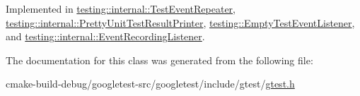 Implemented in \mbox{\hyperlink{classtesting_1_1internal_1_1TestEventRepeater_a70d694ca5010cc86cd458f7f529e6fbe}{testing\+::internal\+::\+Test\+Event\+Repeater}}, \mbox{\hyperlink{classtesting_1_1internal_1_1PrettyUnitTestResultPrinter_a5078ee71cfa97e37ae7a9366149195c5}{testing\+::internal\+::\+Pretty\+Unit\+Test\+Result\+Printer}}, \mbox{\hyperlink{classtesting_1_1EmptyTestEventListener_a84fa74cc9ba742f9f847ea405ca84e5e}{testing\+::\+Empty\+Test\+Event\+Listener}}, and \mbox{\hyperlink{classtesting_1_1internal_1_1EventRecordingListener_aebd488b780fc172d6058ca07ca8f7145}{testing\+::internal\+::\+Event\+Recording\+Listener}}.



The documentation for this class was generated from the following file\+:\begin{DoxyCompactItemize}
\item 
cmake-\/build-\/debug/googletest-\/src/googletest/include/gtest/\mbox{\hyperlink{gtest_8h}{gtest.\+h}}\end{DoxyCompactItemize}
